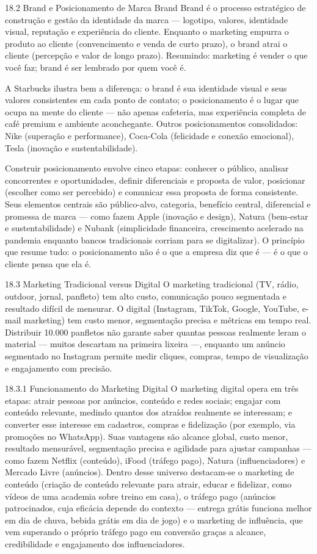 18.2 Brand e Posicionamento de Marca Brand Brand é o processo estratégico de construção e gestão da identidade da marca — logotipo, valores, identidade visual, reputação e experiência do cliente. Enquanto o marketing empurra o produto ao cliente (convencimento e venda de curto prazo), o brand atrai o cliente (percepção e valor de longo prazo). Resumindo: marketing é vender o que você faz; brand é ser lembrado por quem você é.

A Starbucks ilustra bem a diferença: o brand é sua identidade visual e seus valores consistentes em cada ponto de contato; o posicionamento é o lugar que ocupa na mente do cliente — não apenas cafeteria, mas experiência completa de café premium e ambiente aconchegante. Outros posicionamentos consolidados: Nike (superação e performance), Coca-Cola (felicidade e conexão emocional), Tesla (inovação e sustentabilidade).

Construir posicionamento envolve cinco etapas: conhecer o público, analisar concorrentes e oportunidades, definir diferenciais e proposta de valor, posicionar (escolher como ser percebido) e comunicar essa proposta de forma consistente. Seus elementos centrais são público-alvo, categoria, benefício central, diferencial e promessa de marca — como fazem Apple (inovação e design), Natura (bem-estar e sustentabilidade) e Nubank (simplicidade financeira, crescimento acelerado na pandemia enquanto bancos tradicionais corriam para se digitalizar). O princípio que resume tudo: o posicionamento não é o que a empresa diz que é — é o que o cliente pensa que ela é.

18.3 Marketing Tradicional versus Digital O marketing tradicional (TV, rádio, outdoor, jornal, panfleto) tem alto custo, comunicação pouco segmentada e resultado difícil de mensurar. O digital (Instagram, TikTok, Google, YouTube, e-mail marketing) tem custo menor, segmentação precisa e métricas em tempo real. Distribuir 10.000 panfletos não garante saber quantas pessoas realmente leram o material — muitos descartam na primeira lixeira —, enquanto um anúncio segmentado no Instagram permite medir cliques, compras, tempo de visualização e engajamento com precisão.

18.3.1 Funcionamento do Marketing Digital O marketing digital opera em três etapas: atrair pessoas por anúncios, conteúdo e redes sociais; engajar com conteúdo relevante, medindo quantos dos atraídos realmente se interessam; e converter esse interesse em cadastros, compras e fidelização (por exemplo, via promoções no WhatsApp). Suas vantagens são alcance global, custo menor, resultado mensurável, segmentação precisa e agilidade para ajustar campanhas — como fazem Netflix (conteúdo), iFood (tráfego pago), Natura (influenciadores) e Mercado Livre (anúncios). Dentro desse universo destacam-se o marketing de conteúdo (criação de conteúdo relevante para atrair, educar e fidelizar, como vídeos de uma academia sobre treino em casa), o tráfego pago (anúncios patrocinados, cuja eficácia depende do contexto — entrega grátis funciona melhor em dia de chuva, bebida grátis em dia de jogo) e o marketing de influência, que vem superando o próprio tráfego pago em conversão graças a alcance, credibilidade e engajamento dos influenciadores.

